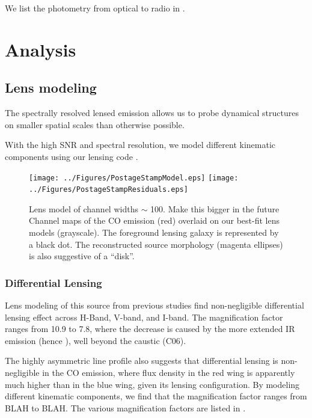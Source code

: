 \documentclass[]{emulateapj}
\begin{document}
We list the photometry from optical to radio in .



\section{Analysis}
\subsection{Lens modeling} \label{lensmodel}
The spectrally resolved lensed emission allows us to probe dynamical structures on smaller spatial scales than otherwise possible.


With the high SNR and spectral resolution, we model different kinematic components using our lensing code \uvmcmcfit.





\begin{figure}[tbph]
\centering
\texttt{[image: ../Figures/PostageStampModel.eps]}
\texttt{[image: ../Figures/PostageStampResiduals.eps]}
\caption{
Lens model of channel widths $\sim$ 100\kms.
Make this bigger in the future
Channel maps of the CO emission (red) overlaid on our best-fit lens models (grayscale). The foreground lensing galaxy is represented by a black dot. The reconstructed source morphology (magenta ellipses) is also suggestive of a “disk”.
\label{fig:model}}
\end{figure}



\subsubsection{Differential Lensing} \label{sec:differential}
Lens modeling of this source from previous studies find non-negligible differential lensing effect across H-Band, V-band, and I-band. The magnification factor ranges from 10.9
to 7.8, where the decrease is caused
by the more extended IR emission (hence \SF), well beyond the caustic (C06).

The highly asymmetric \bco line profile also suggests that differential lensing is non-negligible in the CO emission, where
flux density in the red wing is apparently much higher than in the blue wing, given its lensing configuration.
By modeling different kinematic components, we find that the magnification factor ranges from BLAH to BLAH. The various magnification factors are listed in .

\end{document}
